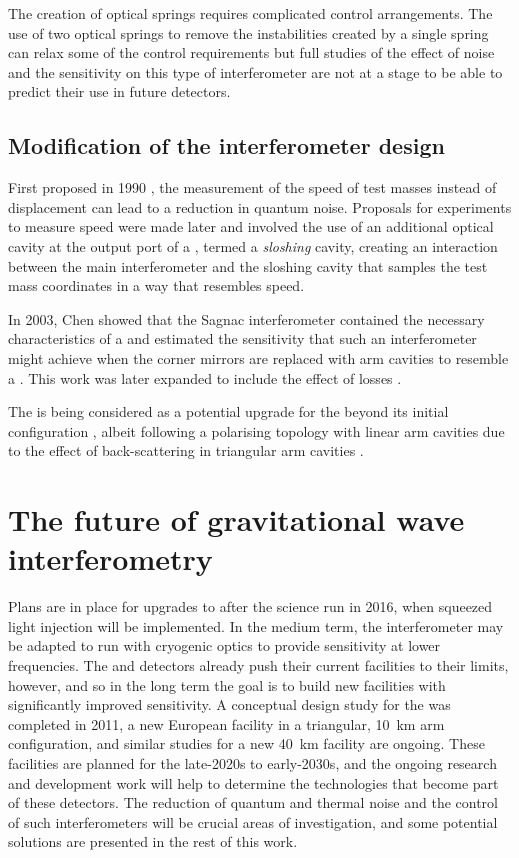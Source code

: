 The creation of optical springs requires complicated control arrangements. The use of two optical springs to remove the instabilities created by a single spring can relax some of the control requirements but full studies of the effect of noise and the sensitivity on this type of interferometer are not at a stage to be able to predict their use in future detectors.

\subsection{Modification of the interferometer design}
First proposed in 1990 \cite{Braginsky1990}, the measurement of the speed of test masses instead of displacement can lead to a reduction in quantum noise. Proposals for experiments to measure speed were made later and involved the use of an additional optical cavity at the output port of a \MI{} \cite{Braginsky2000, Purdue2002}, termed a \emph{sloshing} cavity, creating an interaction between the main interferometer and the sloshing cavity that samples the test mass coordinates in a way that resembles speed.

In 2003, Chen showed that the Sagnac interferometer contained the necessary characteristics of a \SM{} \cite{Chen2003} and estimated the sensitivity that such an interferometer might achieve when the corner mirrors are replaced with arm cavities to resemble a \FPMI{}. This work was later expanded to include the effect of losses \cite{Danilishin2004, Danilishin2015}.

The \SSM{} is being considered as a potential upgrade for the \ET{} beyond its initial configuration \cite{Wang2013, Huttner2016}, albeit following a polarising topology with linear arm cavities \cite{Danilishin2004} due to the effect of back-scattering in triangular arm cavities .

\section{The future of gravitational wave interferometry}
Plans are in place for upgrades to \ALIGO{} after the science run in 2016, when squeezed light injection will be implemented. In the medium term, the interferometer may be adapted to run with cryogenic optics to provide sensitivity at lower frequencies. The \ALIGO{} and \AVIRGO{} detectors already push their current facilities to their limits, however, and so in the long term the goal is to build new facilities with significantly improved sensitivity. A conceptual design study for the \ET{} was completed in 2011, a new European facility in a triangular, \SI{10}{\kilo\meter} arm configuration, and similar studies for a new \SI{40}{\kilo\meter} \LIGO{} facility are ongoing. These facilities are planned for the late-2020s to early-2030s, and the ongoing research and development work will help to determine the technologies that become part of these detectors. The reduction of quantum and thermal noise and the control of such interferometers will be crucial areas of investigation, and some potential solutions are presented in the rest of this work.